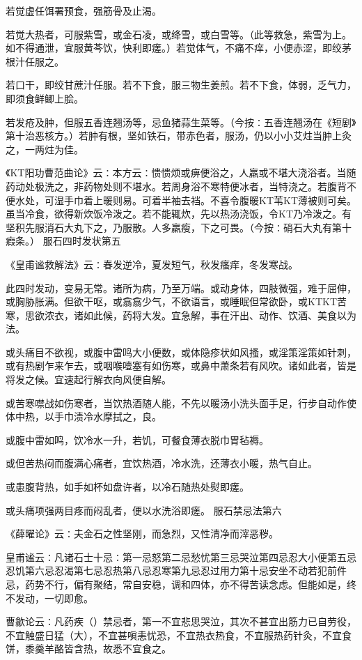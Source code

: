 \documentclass[a4paper,12pt,UTF8,twoside]{ctexbook}
\begin{document}
若觉虚任饵署预食，强筋骨及止渴。

若觉大热者，可服紫雪，或金石凌，或绛雪，或白雪等。（此等救急，紫雪为上。如不得通泄，宜服黄芩饮，快利即瘥。）若觉体气，不痛不痒，小便赤涩，即绞茅根汁任服之。

若口干，即绞甘蔗汁任服。若不下食，服三物生姜煎。若不下食，体弱，乏气力，即须食鲜鲫上脍。

若发疮及肿，但服五香连翘汤等，忌鱼猪蒜生菜等。（今按∶五香连翘汤在《短剧》第十治恶核方。）若肿有根，坚如铁石，带赤色者，服汤，仍以小小艾炷当肿上灸之，一两炷为佳。

《KT阳功曹范曲论》云∶本方云∶愦愦烦或痹便浴之，人羸或不堪大浇浴者。当随药动处极洗之，非药物处则不堪水。若周身浴不寒特便冰者，当特浇之。若腹背不便水处，可湿手巾着上暖则易。可着半袖去裆。不喜令腹暖KT苇KT薄被则可矣。虽当冷食，欲得新炊饭冷泼之。若不能辄炊，先以热汤浇饭，令KT乃冷泼之。有坚积先服消石大丸下之，乃服散。人多羸瘦，下之可畏。（今按∶硝石大丸有第十瘕条。）
服石四时发状第五

《皇甫谧救解法》云∶春发逆冷，夏发短气，秋发瘙痒，冬发寒战。

此四时发动，变易无常。诸所为病，乃至万端。或动身体，四肢微强，难于屈伸，或胸胁胀满。但欲干呕，或翕翕少气，不欲语言，或睡眠但常欲卧，或KTKT苦寒，思欲浓衣，诸如此候，药将大发。宜急解，事在汗出、动作、饮酒、美食以为法。

或头痛目不欲视，或腹中雷鸣大小便数，或体隐疹状如风搔，或淫策淫策如针刺，或有热剧乍来乍去，或咽喉噎塞有如伤寒，或鼻中萧条若有风吹。诸如此者，皆是将发之候。宜速起行解衣向风便自解。

或苦寒噤战如伤寒者，当饮热酒随人能，不先以暖汤小洗头面手足，行步自动作使体中热，以手巾渍冷水摩拭之，良。

或腹中雷如鸣，饮冷水一升，若饥，可餐食薄衣脱巾胃毡褥。

或但苦热闷而腹满心痛者，宜饮热酒，冷水洗，还薄衣小暖，热气自止。

或患腹背热，如手如杯如盘许者，以冷石随热处熨即瘥。

或头痛项强两目疼而闷乱者，便以水洗浴即瘥。
服石禁忌法第六

《薛曜论》云∶夫金石之性坚刚，而急烈，又性清净而滓恶秽。

皇甫谧云∶凡诸石士十忌∶第一忌怒第二忌愁忧第三忌哭泣第四忌忍大小便第五忌忍饥第六忌忍渴第七忌忍热第八忌忍寒第九忌忍过用力第十忌安坐不动若犯前件忌，药势不行，偏有聚结，常自安稳，调和四体，亦不得苦读念虑。但能如是，终不发动，一切即愈。

曹歙论云∶凡药疾（）禁忌者，第一不宜悲思哭泣，其次不甚宜出筋力已自劳役，不宜触盛日猛（大），不宜甚嗔恚忧恐，不宜热衣热食，不宜服热药针灸，不宜食饼，黍羹羊酪皆含热，故悉不宜食之。
\end{document}
